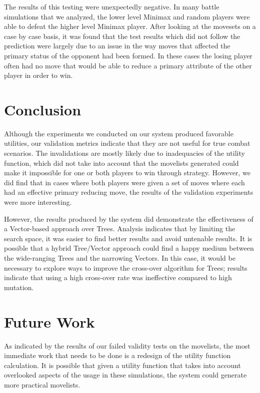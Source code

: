 \documentclass{acm_proc_article-sp}
\begin{document}
The results of this testing were unexpectedly negative. In many battle simulations that we analyzed, the lower level Minimax and random players were able to defeat the higher level Minimax player. After looking at the movesets on a case by case basis, it was found that the test results which did not follow the prediction were largely due to an issue in the way moves that affected the primary status of the opponent had been formed. In these cases the losing player often had no move that would be able to reduce a primary attribute of the other player in order to win.
    
    \section{Conclusion}
    
    Although the experiments we conducted on our system produced favorable utilities, our validation metrics indicate that they are not useful for true combat scenarios. The invalidations are mostly likely due to inadequacies of the utility function, which did not take into account that the movelists generated could make it impossible for one or both players to win through strategy. However, we did find that in cases where both players were given a set of moves where each had an effective primary reducing move, the results of the validation experiments were more interesting.
    
    However, the results produced by the system did demonstrate the effectiveness of a Vector-based approach over Trees. Analysis indicates that by limiting the search space, it was easier to find better results and avoid untenable results. It is possible that a hybrid Tree/Vector approach could find a happy medium between the wide-ranging Trees and the narrowing Vectors. In this case, it would be necessary to explore ways to improve the cross-over algorithm for Trees; results indicate that using a high cross-over rate was ineffective compared to high mutation. 
    
    \section{Future Work}

    As indicated by the results of our failed validity tests on the movelists, the most immediate work that needs to be done is a redesign of the utility function calculation. It is possible that given a utility function that takes into account overlooked aspects of the usage in these simulations, the system could generate more practical movelists.
\end{document}
